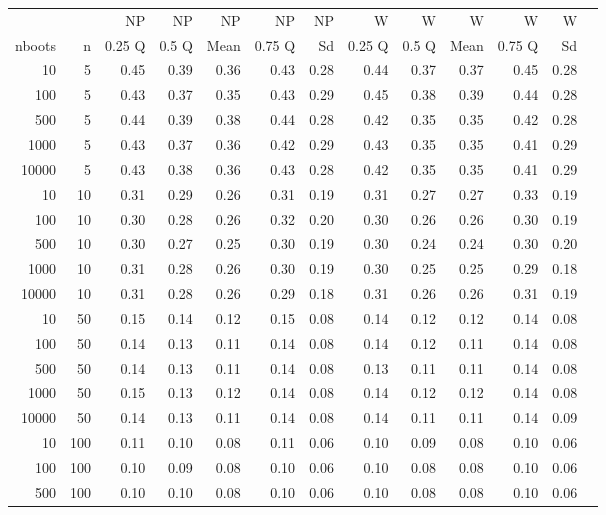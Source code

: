 \begin{table}[ht]
\footnotesize
\centering
\begin{tabular}{rrrrrrrrrrrrr}
  \hline
  & & NP & NP & NP & NP & NP & W & W & W & W & W \\
nboots & n & 0.25 Q & 0.5 Q & Mean & 0.75 Q & Sd & 0.25 Q & 0.5 Q & Mean & 0.75 Q & Sd \\ 
  \hline
10 & 5 & 0.45 & 0.39 & 0.36 & 0.43 & 0.28 & 0.44 & 0.37 & 0.37 & 0.45 & 0.28 \\ 
  100 & 5 & 0.43 & 0.37 & 0.35 & 0.43 & 0.29 & 0.45 & 0.38 & 0.39 & 0.44 & 0.28 \\ 
  500 & 5 & 0.44 & 0.39 & 0.38 & 0.44 & 0.28 & 0.42 & 0.35 & 0.35 & 0.42 & 0.28 \\ 
  1000 & 5 & 0.43 & 0.37 & 0.36 & 0.42 & 0.29 & 0.43 & 0.35 & 0.35 & 0.41 & 0.29 \\ 
  10000 & 5 & 0.43 & 0.38 & 0.36 & 0.43 & 0.28 & 0.42 & 0.35 & 0.35 & 0.41 & 0.29 \\ 
  10 & 10 & 0.31 & 0.29 & 0.26 & 0.31 & 0.19 & 0.31 & 0.27 & 0.27 & 0.33 & 0.19 \\ 
  100 & 10 & 0.30 & 0.28 & 0.26 & 0.32 & 0.20 & 0.30 & 0.26 & 0.26 & 0.30 & 0.19 \\ 
  500 & 10 & 0.30 & 0.27 & 0.25 & 0.30 & 0.19 & 0.30 & 0.24 & 0.24 & 0.30 & 0.20 \\ 
  1000 & 10 & 0.31 & 0.28 & 0.26 & 0.30 & 0.19 & 0.30 & 0.25 & 0.25 & 0.29 & 0.18 \\ 
  10000 & 10 & 0.31 & 0.28 & 0.26 & 0.29 & 0.18 & 0.31 & 0.26 & 0.26 & 0.31 & 0.19 \\ 
  10 & 50 & 0.15 & 0.14 & 0.12 & 0.15 & 0.08 & 0.14 & 0.12 & 0.12 & 0.14 & 0.08 \\ 
  100 & 50 & 0.14 & 0.13 & 0.11 & 0.14 & 0.08 & 0.14 & 0.12 & 0.11 & 0.14 & 0.08 \\ 
  500 & 50 & 0.14 & 0.13 & 0.11 & 0.14 & 0.08 & 0.13 & 0.11 & 0.11 & 0.14 & 0.08 \\ 
  1000 & 50 & 0.15 & 0.13 & 0.12 & 0.14 & 0.08 & 0.14 & 0.12 & 0.12 & 0.14 & 0.08 \\ 
  10000 & 50 & 0.14 & 0.13 & 0.11 & 0.14 & 0.08 & 0.14 & 0.11 & 0.11 & 0.14 & 0.09 \\ 
  10 & 100 & 0.11 & 0.10 & 0.08 & 0.11 & 0.06 & 0.10 & 0.09 & 0.08 & 0.10 & 0.06 \\ 
  100 & 100 & 0.10 & 0.09 & 0.08 & 0.10 & 0.06 & 0.10 & 0.08 & 0.08 & 0.10 & 0.06 \\ 
  500 & 100 & 0.10 & 0.10 & 0.08 & 0.10 & 0.06 & 0.10 & 0.08 & 0.08 & 0.10 & 0.06 \\ 

\end{tabular}
\end{table}
